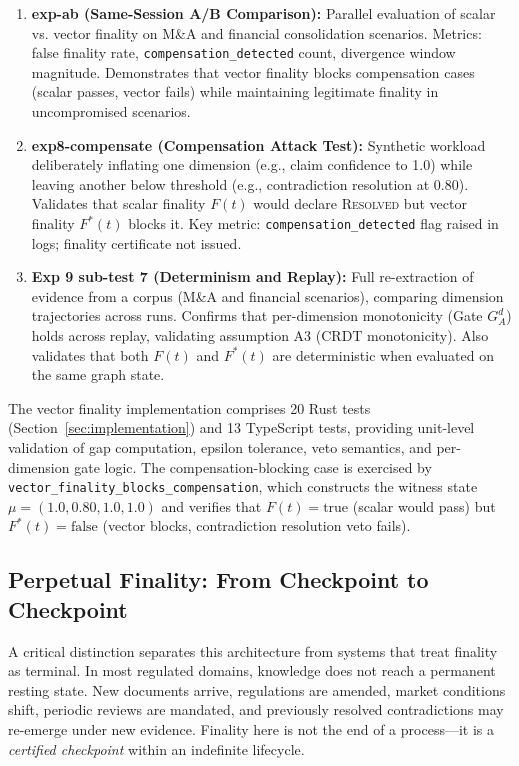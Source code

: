\documentclass[11pt]{article}
\begin{document}
\begin{enumerate}
  \item \textbf{exp-ab (Same-Session A/B Comparison):} Parallel evaluation of scalar vs. vector finality
  on M\&A and financial consolidation scenarios. Metrics: false finality rate, \texttt{compensation\_detected}
  count, divergence window magnitude. Demonstrates that vector finality blocks compensation cases
  (scalar passes, vector fails) while maintaining legitimate finality in uncompromised scenarios.

  \item \textbf{exp8-compensate (Compensation Attack Test):} Synthetic workload deliberately inflating
  one dimension (e.g., claim confidence to 1.0) while leaving another below threshold (e.g., contradiction
  resolution at 0.80). Validates that scalar finality $F(t)$ would declare \textnormal{\textsc{Resolved}}
  but vector finality $F^*(t)$ blocks it. Key metric: \texttt{compensation\_detected} flag raised
  in logs; finality certificate not issued.

  \item \textbf{Exp 9 sub-test 7 (Determinism and Replay):} Full re-extraction of evidence from
  a corpus (M\&A and financial scenarios), comparing dimension trajectories across runs. Confirms
  that per-dimension monotonicity (Gate $G_A^d$) holds across replay, validating assumption A3
  (CRDT monotonicity). Also validates that both $F(t)$ and $F^*(t)$ are deterministic when evaluated
  on the same graph state.
\end{enumerate}

The vector finality implementation comprises 20 Rust tests (Section~\ref{sec:implementation})
and 13 TypeScript tests, providing unit-level validation of gap computation, epsilon tolerance,
veto semantics, and per-dimension gate logic. The compensation-blocking case is exercised by
\texttt{vector\_finality\_blocks\_compensation}, which constructs the witness state $\mu = (1.0, 0.80, 1.0, 1.0)$
and verifies that $F(t) = \text{true}$ (scalar would pass) but $F^*(t) = \text{false}$ (vector blocks,
contradiction resolution veto fails).

\subsection{Perpetual Finality: From Checkpoint to Checkpoint}
\label{sec:perpetual-finality}

A critical distinction separates this architecture from systems that treat finality as terminal. In most regulated domains, knowledge does not reach a permanent resting state. New documents arrive, regulations are amended, market conditions shift, periodic reviews are mandated, and previously resolved contradictions may re-emerge under new evidence. Finality here is not the end of a process---it is a \emph{certified checkpoint} within an indefinite lifecycle.
\end{document}
